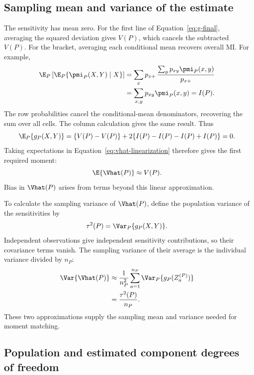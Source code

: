 \subsection{Sampling mean and variance of the estimate}

The sensitivity has mean zero. For the first line of
Equation~\eqref{eq:g-final}, averaging the squared deviation gives
\(V(P)\), which cancels the subtracted \(V(P)\). For the bracket,
averaging each conditional mean recovers overall MI. For example,
\begin{align*}
  \E_P\left[\E_P\{\pmi_P(X,Y)\mid X\}\right]
  &=\sum_xp_{x+}\,
    \frac{\sum_yp_{xy}\pmi_P(x,y)}{p_{x+}}\\
  &=\sum_{x,y}p_{xy}\pmi_P(x,y)=I(P).
\end{align*}
The row probabilities cancel the conditional-mean denominators,
recovering the sum over all cells. The column calculation gives the same
result. Thus
\begin{equation}
  \E_P\{g_P(X,Y)\}
  =\{V(P)-V(P)\}
   +2\{I(P)-I(P)-I(P)+I(P)\}=0.
\end{equation}
Taking expectations in Equation~\eqref{eq:vhat-linearization} therefore
gives the first required moment:
\begin{equation}
  \E\{\Vhat(P)\}\approx V(P).
  \label{eq:vhat-mean-approximation}
\end{equation}
Bias in \(\Vhat(P)\) arises from terms beyond this linear approximation.

To calculate the sampling variance of \(\Vhat(P)\), define the
population variance of the sensitivities by
\begin{equation}
  \tau^2(P)=\Var_P\{g_P(X,Y)\}.
  \label{eq:tau-definition}
\end{equation}
Independent observations give independent sensitivity contributions, so
their covariance terms vanish. The sampling variance of their average is
the individual variance divided by \(n_P\):
\begin{align}
  \Var\{\Vhat(P)\}
  &\approx\frac{1}{n_P^2}
    \sum_{a=1}^{n_P}\Var_P\{g_P(Z_a^{(P)})\}\notag\\
  &=\frac{\tau^2(P)}{n_P}.
  \label{eq:vhat-sampling-variance}
\end{align}
These two approximations supply the sampling mean and variance needed
for moment matching.


\subsection{Population and estimated component degrees of freedom}

